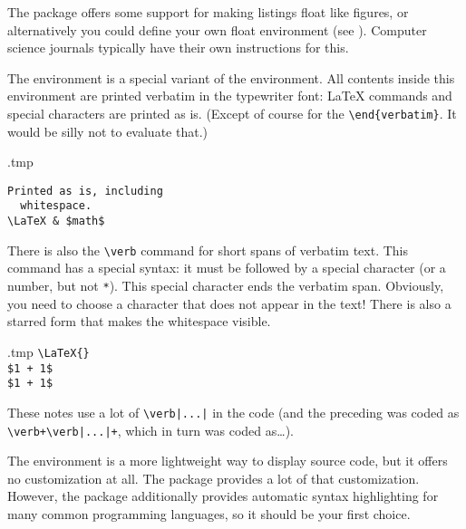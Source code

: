 The package offers some support for making listings float like figures,
or alternatively you could define your own float environment (see ).
Computer science journals typically have their own instructions for this.

The  environment is a special variant of the  environment.
All contents inside this environment are printed verbatim
in the typewriter font: \LaTeX{} commands and special characters are printed as is.
(Except of course for the \verb|\end{verbatim}|.
It would be silly not to evaluate that.)

\begin{VerbatimOut}{\jobname.tmp}
\begin{verbatim}
Printed as is, including
  whitespace.
\LaTeX & $math$
\end{verbatim}
\end{VerbatimOut}
\ShowExample

There is also the \verb|\verb| command for short spans of verbatim text.
This command has a special syntax:
it must be followed by a special character (or a number, but not \verb|*|).
This special character ends the verbatim span.
Obviously, you need to choose a character that does not appear in the text!
There is also a starred form that makes the whitespace visible.
%
\begin{VerbatimOut}{\jobname.tmp}
\verb+\LaTeX{}+ \\
\verb|$1 + 1$| \\
\verb*|$1 + 1$|
\end{VerbatimOut}
\ShowExample
%
These notes use a lot of \verb+\verb|...|+ in the code
(and the preceding was coded as
\verb!\verb+\verb|...|+!, which in turn was coded as\dots).

The  environment is a more lightweight way to display source code,
but it offers no customization at all.
The  package provides a lot of that customization.
However, the  package additionally provides automatic syntax highlighting
for many common programming languages, so it should be your first choice.

